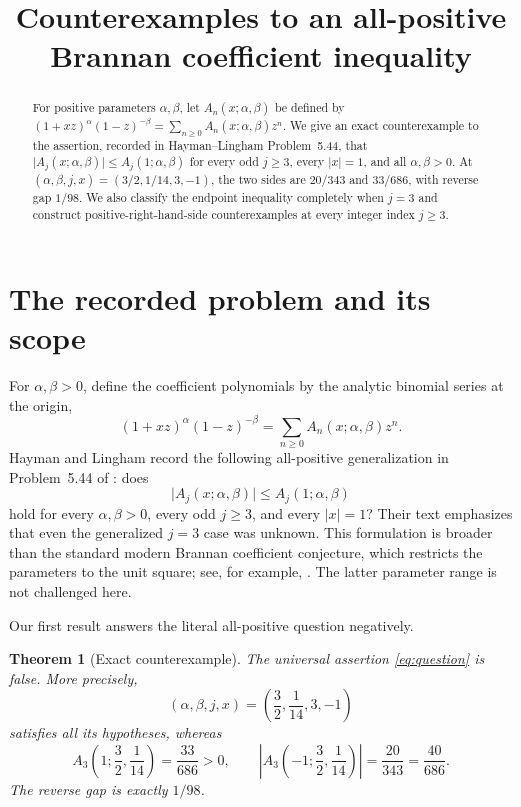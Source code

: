 \documentclass[a4paper]{amsart}
\title[Counterexamples to a Brannan coefficient inequality]
  {Counterexamples to an all-positive Brannan coefficient inequality}
\author{}
\date{}
\newtheorem{theorem}{Theorem}[section]
\theoremstyle{remark}
\begin{document}
\begin{abstract}
For positive parameters \(\alpha,\beta\), let \(A_n(x;\alpha,\beta)\) be defined by
\((1+xz)^\alpha(1-z)^{-\beta}=\sum_{n\geq0}A_n(x;\alpha,\beta)z^n\).
We give an exact counterexample to the assertion, recorded in Hayman--Lingham Problem~5.44, that
\(\lvert A_j(x;\alpha,\beta)\rvert\leq A_j(1;\alpha,\beta)\) for every odd \(j\geq3\), every \(\lvert x\rvert=1\), and all \(\alpha,\beta>0\).
At \((\alpha,\beta,j,x)=(3/2,1/14,3,-1)\), the two sides are \(20/343\) and \(33/686\), with reverse gap \(1/98\).
We also classify the endpoint inequality completely when \(j=3\) and construct positive-right-hand-side counterexamples at every integer index \(j\geq3\).
\end{abstract}

\maketitle
{}

\section{The recorded problem and its scope}

For \(\alpha,\beta>0\), define the coefficient polynomials by the analytic binomial series at the origin,
\begin{equation}\label{eq:def}
 (1+xz)^\alpha(1-z)^{-\beta}
 =\sum_{n\geq0}A_n(x;\alpha,\beta)z^n.
\end{equation}
Hayman and Lingham record the following all-positive generalization in Problem~5.44 of
\cite{HaymanLingham}: does
\begin{equation}\label{eq:question}
 \lvert A_j(x;\alpha,\beta)\rvert\leq A_j(1;\alpha,\beta)
\end{equation}
hold for every \(\alpha,\beta>0\), every odd \(j\geq3\), and every \(\lvert x\rvert=1\)?
Their text emphasizes that even the generalized \(j=3\) case was unknown.  This formulation is broader than the standard modern Brannan coefficient conjecture, which restricts the parameters to the unit square; see, for example, \cite{RuscheweyhSalinas,CotirlaSzasz,DunsterI,DunsterII}.  The latter parameter range is not challenged here.

Our first result answers the literal all-positive question negatively.

\begin{theorem}[Exact counterexample]\label{thm:counterexample}
The universal assertion \eqref{eq:question} is false.  More precisely,
\[
 (\alpha,\beta,j,x)=\left(\frac32,\frac1{14},3,-1\right)
\]
satisfies all its hypotheses, whereas
\[
 A_3\left(1;\frac32,\frac1{14}\right)=\frac{33}{686}>0,
 \qquad
 \left\lvert A_3\left(-1;\frac32,\frac1{14}\right)\right\rvert
 =\frac{20}{343}=\frac{40}{686}.
\]
The reverse gap is exactly \(1/98\).
\end{theorem}
\end{document}
